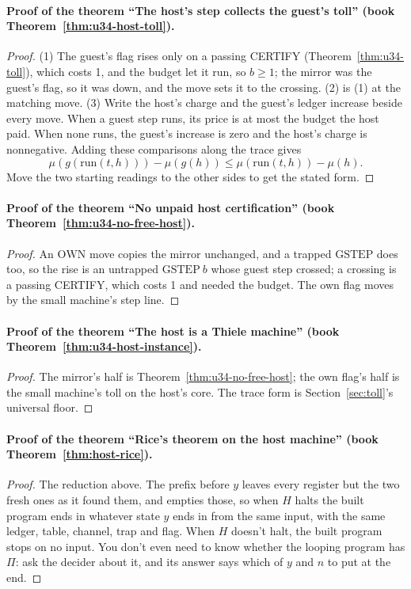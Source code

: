 \documentclass[11pt,twoside]{article}
\theoremstyle{thielethm}
\theoremstyle{thieledef}
\theoremstyle{thieledef}
\theoremstyle{thieledef}
\theoremstyle{thielethm}
\theoremstyle{thieleobs}
\theoremstyle{thielethm}
\begin{document}
\paragraph{Proof of the theorem ``The host's step collects the guest's toll'' (book Theorem~\ref{thm:u34-host-toll}).}
\begin{proof}
(1) The guest's flag rises only on a passing CERTIFY (Theorem~\ref{thm:u34-toll}), which costs
1, and the budget let it run, so $b \ge 1$; the mirror was the guest's flag, so it was down,
and the move sets it to the crossing. (2) is (1) at the matching move. (3) Write the host's charge and the guest's ledger increase beside every
move. When a guest step runs, its price is at most the budget the host paid.
When none runs, the guest's increase is zero and the host's charge is
nonnegative. Adding these comparisons along the trace gives
\[
 \mu(g(\mathrm{run}(t,h)))-\mu(g(h))
 \le \mu(\mathrm{run}(t,h))-\mu(h).
\]
Move the two starting readings to the other sides to get the stated form.
\end{proof}

\paragraph{Proof of the theorem ``No unpaid host certification'' (book Theorem~\ref{thm:u34-no-free-host}).}
\begin{proof}
An $\mathrm{OWN}$ move copies the mirror unchanged, and a trapped $\mathrm{GSTEP}$ does too, so
the rise is an untrapped $\mathrm{GSTEP}\ b$ whose guest step crossed; a crossing is a passing
CERTIFY, which costs 1 and needed the budget. The own flag moves by the small machine's step line.
\end{proof}

\paragraph{Proof of the theorem ``The host is a Thiele machine'' (book Theorem~\ref{thm:u34-host-instance}).}
\begin{proof}
The mirror's half is Theorem~\ref{thm:u34-no-free-host}; the own flag's half is the small
machine's toll on the host's core. The trace form is Section~\ref{sec:toll}'s universal floor.
\end{proof}

\paragraph{Proof of the theorem ``Rice's theorem on the host machine'' (book Theorem~\ref{thm:host-rice}).}
\begin{proof}
The reduction above. The prefix before $y$ leaves every register but the two fresh ones as it
found them, and empties those, so when $H$ halts the built program ends in whatever state $y$ ends
in from the same input, with the same ledger, table, channel, trap and flag. When $H$ doesn't halt,
the built program stops on no input. You don't even need to know whether the looping program has
$\Pi$: ask the decider about it, and its answer says which of $y$ and $n$ to put at the end.
\end{proof}
\end{document}
